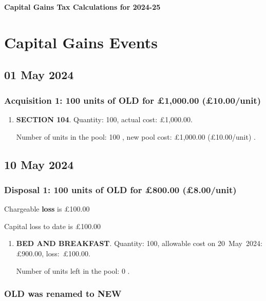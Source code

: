 \documentclass{article}
\begin{document}
\centerline{\Large\bfseries Capital Gains Tax Calculations for 2024-25}

\section*{Capital Gains Events}


\subsection*{01 May 2024}
\subsubsection*{
    Acquisition 1: 100 units of OLD for £1,000.00
    (£10.00/unit)%
}

\begin{enumerate}
\item \textbf{SECTION 104}. Quantity: 100,
    actual cost: £1,000.00.

    Number of units in the pool:
    100%
,
    new pool cost: £1,000.00
    (£10.00/unit)%
.

\end{enumerate}



\subsection*{10 May 2024}
\subsubsection*{
    Disposal 1: 100 units of OLD
for £800.00
    (£8.00/unit)%
}
Chargeable \textbf{loss} is £100.00

Capital loss to date is £100.00

\begin{enumerate}
\item \textbf{BED AND BREAKFAST}. Quantity: 100,
    allowable
    cost on \mbox{20 May 2024:}
    £900.00,
    \mbox{loss: £100.00.}

    Number of units left in the pool:
    0%
.

\end{enumerate}

\subsubsection*{
    OLD was renamed to NEW%
}
\end{document}

